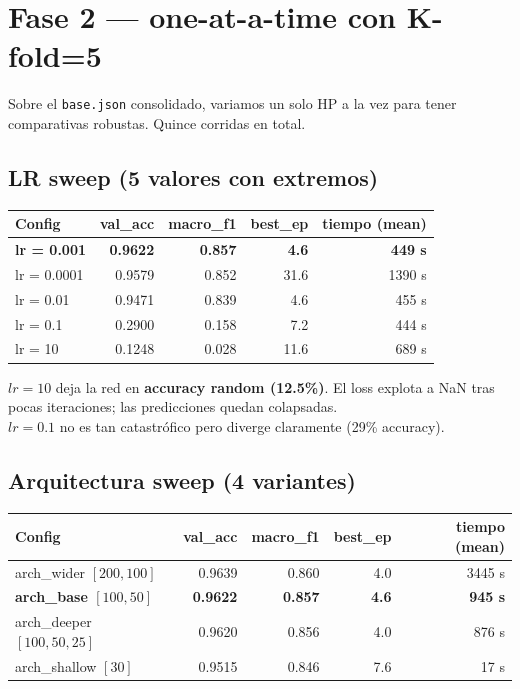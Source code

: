 \documentclass[11pt,a4paper]{article}
\newcommand{\code}[1]{\texttt{\textcolor{accent}{#1}}}
\newcommand{\winner}[1]{\cellcolor{accent2!15}\textbf{#1}}
\begin{document}
\section{Fase 2 — one-at-a-time con K-fold=5}

Sobre el \code{base.json} consolidado, variamos un solo HP a la vez para tener comparativas robustas. Quince corridas en total.

\subsection{LR sweep (5 valores con extremos)}

\begin{center}
\small
\begin{tabular}{@{}lrrrr@{}}
\toprule
\textbf{Config} & \textbf{val\_acc} & \textbf{macro\_f1} & \textbf{best\_ep} & \textbf{tiempo (mean)} \\
\midrule
\winner{lr = 0.001}    & \winner{0.9622} & \winner{0.857} & \winner{4.6}  & \winner{449 s} \\
lr = 0.0001            & 0.9579 & 0.852 & 31.6 & 1390 s \\
lr = 0.01              & 0.9471 & 0.839 & 4.6  & 455 s \\
lr = 0.1               & 0.2900 & 0.158 & 7.2  & 444 s \\
lr = 10                & 0.1248 & 0.028 & 11.6 & 689 s \\
\bottomrule
\end{tabular}
\end{center}

\begin{sorpresa}
$lr = 10$ deja la red en \textbf{accuracy random (12.5\%)}. El loss explota a NaN tras pocas iteraciones; las predicciones quedan colapsadas. \\[0.2em]
$lr = 0.1$ no es tan catastrófico pero diverge claramente (29\% accuracy).
\end{sorpresa}

\subsection{Arquitectura sweep (4 variantes)}

\begin{center}
\small
\begin{tabular}{@{}lrrrr@{}}
\toprule
\textbf{Config} & \textbf{val\_acc} & \textbf{macro\_f1} & \textbf{best\_ep} & \textbf{tiempo (mean)} \\
\midrule
arch\_wider $[200,100]$    & 0.9639 & 0.860 & 4.0  & 3445 s \\
\winner{arch\_base $[100,50]$}   & \winner{0.9622} & \winner{0.857} & \winner{4.6} & \winner{945 s} \\
arch\_deeper $[100,50,25]$  & 0.9620 & 0.856 & 4.0  & 876 s \\
arch\_shallow $[30]$        & 0.9515 & 0.846 & 7.6  & 17 s \\
\bottomrule
\end{tabular}
\end{center}
\end{document}
